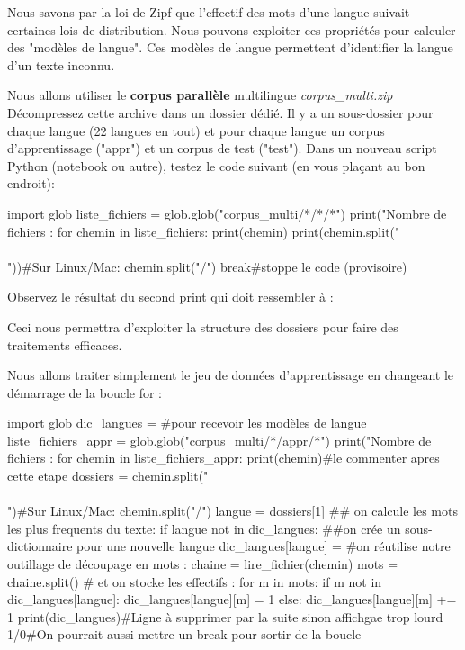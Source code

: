  \vspace{0.5cm}
                    
 Nous savons par la loi de Zipf que l'effectif des mots d'une langue suivait certaines lois de distribution.
 Nous pouvons exploiter ces propriétés pour calculer des "modèles de langue".
 Ces modèles de langue permettent d'identifier la langue d'un texte inconnu.

 Nous allons utiliser le \textbf{corpus parallèle} multilingue \textit{corpus\_multi.zip}
 Décompressez cette archive dans un dossier dédié. Il y a un sous-dossier pour chaque langue (22 langues en tout) et pour chaque langue un corpus d'apprentissage ("appr") et un corpus de test ("test").
 Dans un nouveau script Python (notebook ou autre), testez le code suivant (en vous plaçant au bon endroit):

\begin{python}
import glob
liste_fichiers = glob.glob("corpus_multi/*/*/*")
print("Nombre de fichiers : %
for chemin in liste_fichiers:
  print(chemin)
  print(chemin.split("\\\\"))#Sur Linux/Mac: chemin.split("/")
  break#stoppe le code (provisoire)
\end{python}

Observez le résultat du second print qui doit ressembler à :

\begin{python}
\end{python}

Ceci nous permettra d'exploiter la structure des dossiers pour faire des traitements efficaces.

\vspace{0.5cm}
\vspace{0.5cm}


Nous allons traiter simplement le jeu de données d'apprentissage en changeant le démarrage de la boucle for :

\begin{python}
import glob
dic_langues = {}#pour recevoir les modèles de langue
liste_fichiers_appr = glob.glob("corpus_multi/*/appr/*")
print("Nombre de fichiers : %
for chemin in liste_fichiers_appr:
  print(chemin)#le commenter apres cette etape
  dossiers = chemin.split("\\\\")#Sur Linux/Mac: chemin.split("/")
  langue = dossiers[1]
  ## on calcule les mots les plus frequents du texte:
  if langue not in dic_langues:
  ##on crée un sous-dictionnaire pour une nouvelle langue
    dic_langues[langue] = {}
  #on réutilise notre outillage de découpage en mots :
  chaine = lire_fichier(chemin)
  mots = chaine.split()
  # et on stocke les effectifs : 
  for m in mots:
    if m not in dic_langues[langue]:
      dic_langues[langue][m] = 1
    else:
      dic_langues[langue][m] += 1
  print(dic_langues)#Ligne à supprimer par la suite sinon affichgae trop lourd
  1/0#On pourrait aussi mettre un break pour sortir de la boucle
\end{python}

